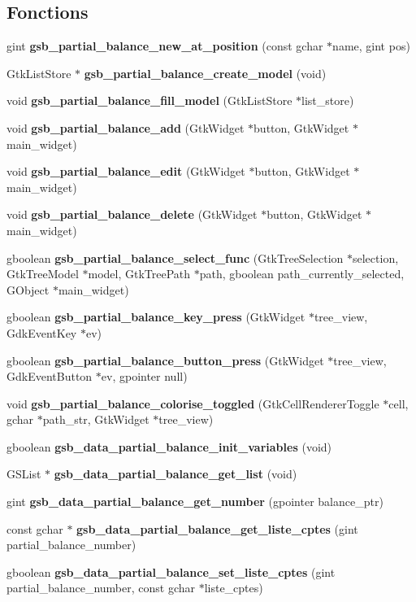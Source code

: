 \subsection*{Fonctions}
\begin{DoxyCompactItemize}
\item 
gint {\bf gsb\_\-partial\_\-balance\_\-new\_\-at\_\-position} (const gchar $\ast$name, gint pos)
\item 
GtkListStore $\ast$ {\bf gsb\_\-partial\_\-balance\_\-create\_\-model} (void)
\item 
void {\bf gsb\_\-partial\_\-balance\_\-fill\_\-model} (GtkListStore $\ast$list\_\-store)
\item 
void {\bf gsb\_\-partial\_\-balance\_\-add} (GtkWidget $\ast$button, GtkWidget $\ast$main\_\-widget)
\item 
void {\bf gsb\_\-partial\_\-balance\_\-edit} (GtkWidget $\ast$button, GtkWidget $\ast$main\_\-widget)
\item 
void {\bf gsb\_\-partial\_\-balance\_\-delete} (GtkWidget $\ast$button, GtkWidget $\ast$main\_\-widget)
\item 
gboolean {\bf gsb\_\-partial\_\-balance\_\-select\_\-func} (GtkTreeSelection $\ast$selection, GtkTreeModel $\ast$model, GtkTreePath $\ast$path, gboolean path\_\-currently\_\-selected, GObject $\ast$main\_\-widget)
\item 
gboolean {\bf gsb\_\-partial\_\-balance\_\-key\_\-press} (GtkWidget $\ast$tree\_\-view, GdkEventKey $\ast$ev)
\item 
gboolean {\bf gsb\_\-partial\_\-balance\_\-button\_\-press} (GtkWidget $\ast$tree\_\-view, GdkEventButton $\ast$ev, gpointer null)
\item 
void {\bf gsb\_\-partial\_\-balance\_\-colorise\_\-toggled} (GtkCellRendererToggle $\ast$cell, gchar $\ast$path\_\-str, GtkWidget $\ast$tree\_\-view)
\item 
gboolean {\bf gsb\_\-data\_\-partial\_\-balance\_\-init\_\-variables} (void)
\item 
GSList $\ast$ {\bf gsb\_\-data\_\-partial\_\-balance\_\-get\_\-list} (void)
\item 
gint {\bf gsb\_\-data\_\-partial\_\-balance\_\-get\_\-number} (gpointer balance\_\-ptr)
\item 
const gchar $\ast$ {\bf gsb\_\-data\_\-partial\_\-balance\_\-get\_\-liste\_\-cptes} (gint partial\_\-balance\_\-number)
\item 
gboolean {\bf gsb\_\-data\_\-partial\_\-balance\_\-set\_\-liste\_\-cptes} (gint partial\_\-balance\_\-number, const gchar $\ast$liste\_\-cptes)

\end{DoxyCompactItemize}
